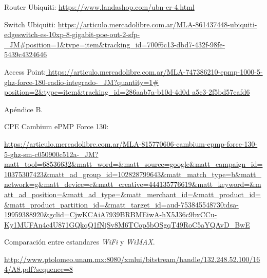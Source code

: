 \newpage






\begin{thebibliography}{99}

 Router Ubiquiti: {\tiny \url{https://www.landashop.com/ubn-er-4.html}}


 Switch Ubiquiti: {\tiny \url{https://articulo.mercadolibre.com.ar/MLA-861437448-ubiquiti-edgeswitch-es-10xp-8-gigabit-poe-out-2-sfp-_JM#position=1&type=item&tracking_id=700f6c13-dbd7-432f-98fe-5439c4324646}}



Access Point:{\tiny \url{ https://articulo.mercadolibre.com.ar/MLA-747386210-epmp-1000-5-ghz-force-180-radio-integrado-_JM?quantity=1# position=2&type=item&tracking_id=286aab7a-b10d-4d0d a5c3-2f5bd57cafd6}}


 Apéndice B.

CPE Cambium ePMP Force 130: \begin{tiny}
\url{https://articulo.mercadolibre.com.ar/MLA-815770606-cambium-epmp-force-130-5-ghz-sm-c050900c512a-_JM?matt_tool=68536632&matt_word=&matt_source=google&matt_campaign_id=10375307423&matt_ad_group_id=102828799643&matt_match_type=b&matt_network=g&matt_device=c&matt_creative=444135776619&matt_keyword=&matt_ad_position=&matt_ad_type=&matt_merchant_id=&matt_product_id=&matt_product_partition_id=&matt_target_id=aud-753845548730:dsa-19959388920&gclid=CjwKCAiA7939BRBMEiwA-hX5J36c9bxCCu-Ky1MUFAn4c4U871GQkqQ1fNjSv8M6TCop5bOSgqT49RoC5aYQAvD_BwE}
\end{tiny}


 Comparación entre estandares \textit{WiFi} y \textit{WiMAX}. \begin{tiny}
\url{http://www.ptolomeo.unam.mx:8080/xmlui/bitstream/handle/132.248.52.100/164/A8.pdf?sequence=8}
\end{tiny}

\end{thebibliography}

\newpage
